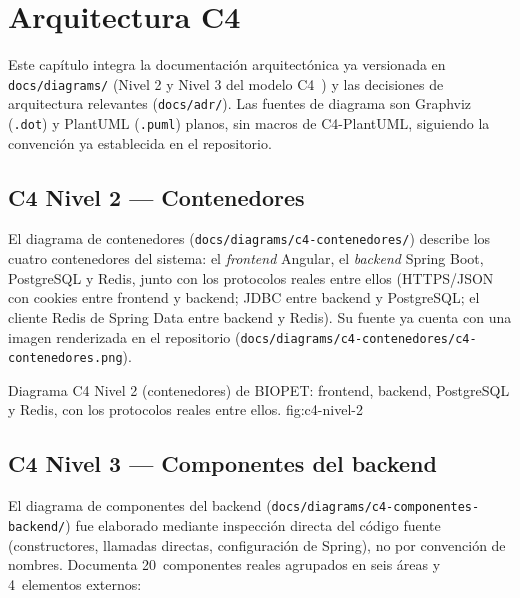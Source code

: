 \chapter{Arquitectura C4}
\label{cap:arquitectura-c4}

Este cap\'itulo integra la documentaci\'on arquitect\'onica ya versionada en
\texttt{docs/diagrams/} (Nivel 2 y Nivel 3 del modelo C4~\cite{c4-model}) y las decisiones
de arquitectura relevantes (\texttt{docs/adr/}). Las fuentes de diagrama
son Graphviz (\texttt{.dot}) y PlantUML (\texttt{.puml}) planos, sin macros
de C4-PlantUML, siguiendo la convenci\'on ya establecida en el repositorio.

\section{C4 Nivel 2 --- Contenedores}
\label{sec:c4-nivel-2}

El diagrama de contenedores (\texttt{docs/diagrams/c4-contenedores/})
describe los cuatro contenedores del sistema: el \emph{frontend} Angular, el
\emph{backend} Spring Boot, PostgreSQL y Redis, junto con los protocolos
reales entre ellos (HTTPS/JSON con cookies entre frontend y backend; JDBC
entre backend y PostgreSQL; el cliente Redis de Spring Data entre backend y
Redis). Su fuente ya cuenta con una imagen renderizada en el repositorio
(\texttt{docs/diagrams/c4-contenedores/c4-contenedores.png}).

%
{Diagrama C4 Nivel 2 (contenedores) de BIOPET: frontend, backend, PostgreSQL y Redis, con los protocolos reales entre ellos.}%
{fig:c4-nivel-2}

\section{C4 Nivel 3 --- Componentes del backend}
\label{sec:c4-nivel-3}

El diagrama de componentes del backend
(\texttt{docs/diagrams/c4-componentes-backend/}) fue elaborado mediante
inspecci\'on directa del c\'odigo fuente (constructores, llamadas
directas, configuraci\'on de Spring), no por convenci\'on de nombres.
Documenta 20~componentes reales agrupados en seis \'areas y 4~elementos
externos:

